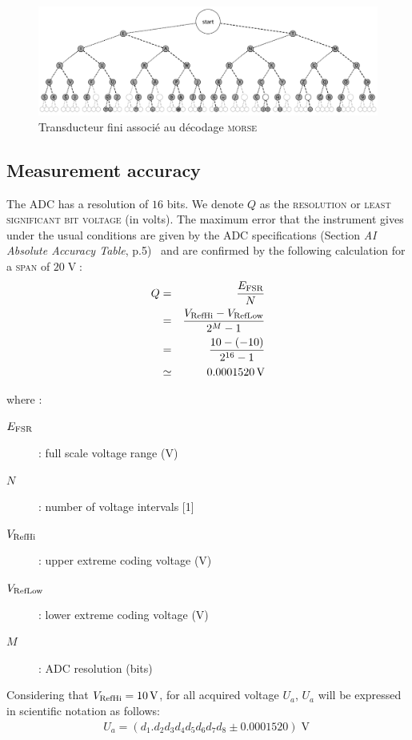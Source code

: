 \documentclass[twocolumn,pre,floats,aps,amsmath,amssymb]{revtex4}
\begin{document}
\begin{figure}
  \includegraphics[width=17cm]{pictures/Morse_code_tree3.png}
\caption{Transducteur fini associ\'e au d\'ecodage \textsc{morse}~\cite{copyright_transducteur_morse}}
\label{fig:transducteur_morse}
\end{figure}

\subsection{Measurement accuracy}

The ADC has a resolution of $16$ bits. We denote $Q$ as the \textsc{resolution} or \textsc{least significant bit voltage} (in volts). The maximum error that the instrument gives under the usual conditions are given by the ADC specifications (Section \textit{AI Absolute Accuracy Table}, p.5)~\cite{NI_6353_datasheet} and are confirmed by the following calculation for a \textsc{span} of $20 \operatorname{V}$:
\begin{eqnarray*}
  Q &=& \frac{E_{\textup{FSR}}}{N}\\
    &=& \frac{V_{\textup{RefHi}} - V_{\textup{RefLow}}}{2^M - 1}\\
    &=& \frac{10 - (-10)}{2^{16} - 1}\\
    &\simeq& 0.0001520 \operatorname{V}
\end{eqnarray*}

where :

\begin{description}
  \item[$E_{\textup{FSR}}$]{ : full scale voltage range (V)}
  \item[$N$]{ : number of voltage intervals [1]}
  \item[$V_{\textup{RefHi}}$]{ : upper extreme coding voltage (V)}
  \item[$V_{\textup{RefLow}}$]{ : lower extreme coding voltage (V)}
  \item[$M$]{ : ADC resolution (bits)}
\end{description}

Considering that $V_{\textup{RefHi}} = 10 \operatorname{V}$, for all acquired voltage $U_a$, $U_a$ will be expressed in scientific notation as follows:
\begin{eqnarray*}
  U_a = \left ( d_1.d_2d_3d_4d_5d_6d_7d_8 \pm 0.0001520 \right ) \operatorname{V}
\end{eqnarray*}
\end{document}
